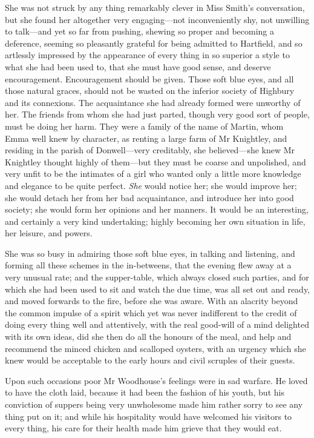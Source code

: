 She was not struck by any thing remarkably clever in Miss Smith's conversation, but she found her altogether very engaging—not inconveniently shy, not unwilling to talk—and yet so far from pushing, shewing so proper and becoming a deference, seeming so pleasantly grateful for being admitted to Hartfield, and so artlessly impressed by the appearance of every thing in so superior a style to what she had been used to, that she must have good sense, and deserve encouragement. Encouragement should be given. Those soft blue eyes, and all those natural graces, should not be wasted on the inferior society of Highbury and its connexions. The acquaintance she had already formed were unworthy of her. The friends from whom she had just parted, though very good sort of people, must be doing her harm. They were a family of the name of Martin, whom Emma well knew by character, as renting a large farm of Mr Knightley, and residing in the parish of Donwell—very creditably, she believed—she knew Mr Knightley thought highly of them—but they must be coarse and unpolished, and very unfit to be the intimates of a girl who wanted only a little more knowledge and elegance to be quite perfect. \textit{She} would notice her; she would improve her; she would detach her from her bad acquaintance, and introduce her into good society; she would form her opinions and her manners. It would be an interesting, and certainly a very kind undertaking; highly becoming her own situation in life, her leisure, and powers.

She was so busy in admiring those soft blue eyes, in talking and listening, and forming all these schemes in the in-betweens, that the evening flew away at a very unusual rate; and the supper-table, which always closed such parties, and for which she had been used to sit and watch the due time, was all set out and ready, and moved forwards to the fire, before she was aware. With an alacrity beyond the common impulse of a spirit which yet was never indifferent to the credit of doing every thing well and attentively, with the real good-will of a mind delighted with its own ideas, did she then do all the honours of the meal, and help and recommend the minced chicken and scalloped oysters, with an urgency which she knew would be acceptable to the early hours and civil scruples of their guests.

Upon such occasions poor Mr Woodhouse's feelings were in sad warfare. He loved to have the cloth laid, because it had been the fashion of his youth, but his conviction of suppers being very unwholesome made him rather sorry to see any thing put on it; and while his hospitality would have welcomed his visitors to every thing, his care for their health made him grieve that they would eat.

